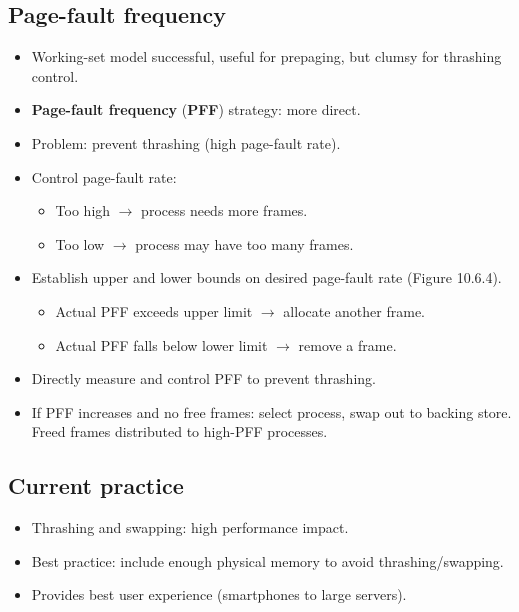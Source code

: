 \subsection{Page-fault frequency}
\begin{itemize}
    \item Working-set model successful, useful for prepaging, but clumsy for thrashing control.
    \item \textbf{Page-fault frequency} (\textbf{PFF}) strategy: more direct.
    \item Problem: prevent thrashing (high page-fault rate).
    \item Control page-fault rate:
    \begin{itemize}
        \item Too high $\rightarrow$ process needs more frames.
        \item Too low $\rightarrow$ process may have too many frames.
    \end{itemize}
    \item Establish upper and lower bounds on desired page-fault rate (Figure 10.6.4).
    \begin{itemize}
        \item Actual PFF exceeds upper limit $\rightarrow$ allocate another frame.
        \item Actual PFF falls below lower limit $\rightarrow$ remove a frame.
    \end{itemize}
    \item Directly measure and control PFF to prevent thrashing.
    \item If PFF increases and no free frames: select process, swap out to backing store. Freed frames distributed to high-PFF processes.
\end{itemize}

\subsection{Current practice}
\begin{itemize}
    \item Thrashing and swapping: high performance impact.
    \item Best practice: include enough physical memory to avoid thrashing/swapping.
    \item Provides best user experience (smartphones to large servers).
\end{itemize}

\vspace{1em}
